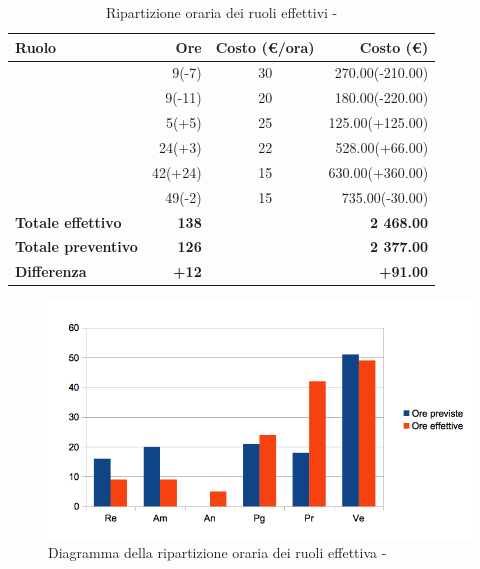 \documentclass[12pt,a4paper]{article}
\begin{document}
\begin{table}[H]
	\begin{center}
		\begin{tabular}{l r c r}
			\toprule
			\textbf{Ruolo}	& \textbf{Ore} & \textbf{Costo (\euro/ora)}	& \textbf{Costo (\euro)} \\ \midrule
			\midrule	
			\RE{} & 9(-7) 	& 30 & 270.00(-210.00) \\ \midrule
			\AM{} & 9(-11)	& 20 & 180.00(-220.00) \\ \midrule
			\AN{} & 5(+5)	& 25 & 125.00(+125.00) \\ \midrule
			\PG{} & 24(+3)	& 22 & 528.00(+66.00) \\ \midrule
			\PR{} & 42(+24)	& 15 & 630.00(+360.00) \\ \midrule
			\VR{} & 49(-2)	& 15 & 735.00(-30.00) \\ \midrule
			\textbf{Totale effettivo} & \textbf{138} &  & \textbf{2 468.00} \\ \midrule
			\textbf{Totale preventivo} & \textbf{126} &  & \textbf{2 377.00} \\ \midrule
			\textbf{Differenza} & \textbf{+12} &  & \textbf{+91.00} \\ \midrule			
			\bottomrule
		\end{tabular}
		\caption{Ripartizione oraria dei ruoli effettivi - \FVV{}}
	\end{center}
\end{table}

\begin{center}
	\begin{figure}[H]
		\centering
		\includegraphics[width=\textwidth]{../img/diagrammaBarreValidazioneConsuntivo.png}
		\caption{Diagramma della ripartizione oraria dei ruoli effettiva - \FVV{}}
	\end{figure}
\end{center}
\end{document}
